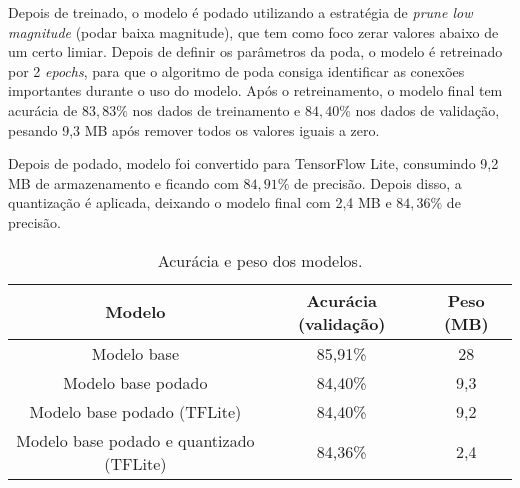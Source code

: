 Depois de treinado, o modelo é podado utilizando a estratégia de \textit{prune low magnitude} (podar baixa magnitude),
que tem como foco zerar valores abaixo de um certo limiar. Depois de definir os parâmetros da poda, o modelo é
retreinado por 2 \textit{epochs}, para que o algoritmo de poda consiga identificar as conexões importantes durante o
uso do modelo. Após o retreinamento, o modelo final tem acurácia de $83,83\%$ nos dados de treinamento e $84,40\%$
nos dados de validação, pesando 9,3 MB após remover todos os valores iguais a zero.

Depois de podado, modelo foi convertido para TensorFlow Lite, consumindo 9,2 MB de armazenamento e ficando com
$84,91\%$ de precisão. Depois disso, a quantização é aplicada, deixando o modelo final com 2,4 MB e $84,36\%$ de
precisão.


\begin{center}
\begin{table}[htb]
\centering
\ABNTEXfontereduzida
\caption[Acurácia e peso dos modelos]{Acurácia e peso dos modelos.}
\label{tabela_acuracia_peso}
\begin{tabular}{ |c|c|c| }
	\hline
	\textbf{Modelo} & \textbf{Acurácia (validação)}  & \textbf{Peso (MB)} \\
	\hline
	Modelo base 				 & 	85,91\% 	& 	28	\\
	Modelo base podado 			 & 	84,40\% 	& 	9,3	\\
	Modelo base podado (TFLite) 		 & 	84,40\% 	& 	9,2	\\
	Modelo base podado e quantizado (TFLite) & 	84,36\% 	& 	2,4	\\
	\hline
\end{tabular}
\end{table}
\end{center}

